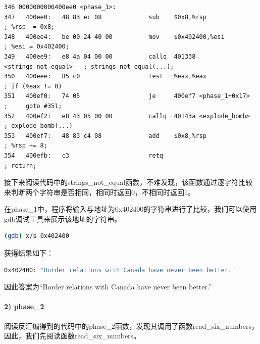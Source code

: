 \documentclass{article}
\begin{document}
\begin{lstlisting}[title = prase\_1反汇编代码及注释, xleftmargin = 2em,xrightmargin = 2em, aboveskip = 1em, numbers = none, basicstyle=\footnotesize\ttfamily]
346 0000000000400ee0 <phase_1>:
347   400ee0:   48 83 ec 08             sub    $0x8,%rsp                    ; %rsp -= 0x8;
348   400ee4:   be 00 24 40 00          mov    $0x402400,%esi               ; %esi = 0x402400;
349   400ee9:   e8 4a 04 00 00          callq  401338 <strings_not_equal>   ; strings_not_equal(...);
350   400eee:   85 c0                   test   %eax,%eax                    ; if (%eax != 0)
351   400ef0:   74 05                   je     400ef7 <phase_1+0x17>        ;     goto #351;
352   400ef2:   e8 43 05 00 00          callq  40143a <explode_bomb>        ; explode_bomb(...)
353   400ef7:   48 83 c4 08             add    $0x8,%rsp                    ; %rsp += 8;
354   400efb:   c3                      retq                                ; return;
\end{lstlisting}

接下来阅读代码中的strings\_not\_equal函数，不难发现，该函数通过逐字符比较来判断两个字符串是否相同，相同时返回0，不相同时返回1。

在phase\_1中，程序将输入与地址为0x402400的字符串进行了比较，我们可以使用gdb调试工具来展示该地址的字符串。
\begin{lstlisting}[language=bash]
    (gdb) x/s 0x402400
\end{lstlisting}
获得结果如下：
\begin{lstlisting}[language=bash]
    0x402400: "Border relations with Canada have never been better."
\end{lstlisting}


因此答案为“Border relations with Canada have never been better.”
\paragraph{2) phase\_2}


阅读反汇编得到的代码中的phase\_2函数，发现其调用了函数read\_six\_numbers，因此，我们先阅读函数read\_six\_numbers。
\end{document}

